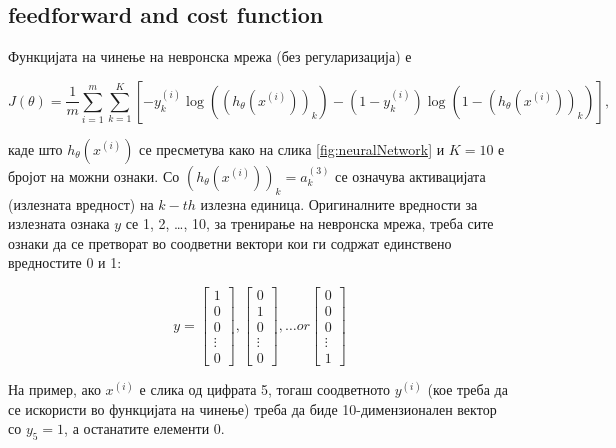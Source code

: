 


\subsection{feedforward and cost function}

Функцијата на чинење на невронска мрежа (без регуларизација) е

\[
	J(\theta) = \frac{1}{m}\sum_{i = 1}^{m}\sum_{k =
	1}^{K}[-y^{(i)}_k\log((h_\theta(x^{(i)}))_k) -
	(1 - y^{(i)}_k)\log(1 - (h_\theta(x^{(i)}))_k)],
\]

каде што $h_\theta(x^{(i)})$ се пресметува како на слика \ref{fig:neuralNetwork}
 и $K = 10$ е бројот на можни ознаки. Со $(h_\theta(x^{(i)}))_k = a^{(3)}_k$ се
 означува активацијата (излезната вредност) на $k-th$ излезна единица.
 Оригиналните вредности за излезната ознака $y$ се 1, 2, \ldots, 10, за
 тренирање на невронска мрежа, треба сите ознаки да се претворат во соодветни
 вектори кои ги содржат единствено вредностите 0 и 1:
 
 \[	
	y = \begin{bmatrix}
		    1 \\
			0 \\
			0 \\
			\vdots \\
			0
			
		\end{bmatrix},
		\begin{bmatrix}
		    0 \\
			1 \\
			0 \\
			\vdots \\
			0
			
		\end{bmatrix},
		\ldots
		or
		\begin{bmatrix}
		    0 \\
			0 \\
			0 \\
			\vdots \\
			1
			
		\end{bmatrix}
 \]

На пример, ако $x^{(i)}$ е слика од цифрата 5, тогаш соодветното $y^{(i)}$ (кое
треба да се искористи во функцијата на чинење) треба да биде 10-димензионален вектор
со $y_5 = 1$, а останатите елементи 0.



